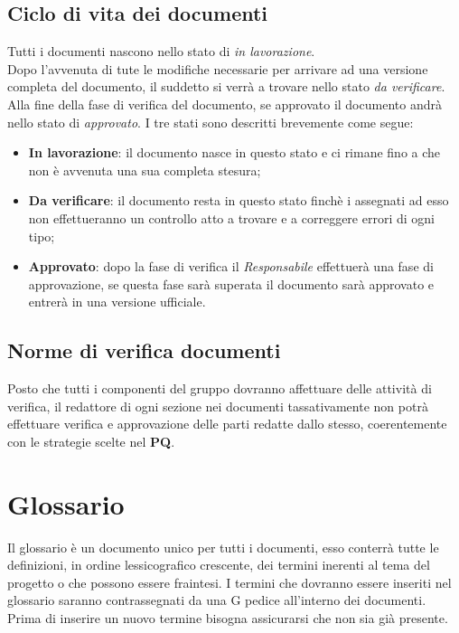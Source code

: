 \documentclass{scalatekids-article}
\begin{document}
\subsection{Ciclo di vita dei documenti}
Tutti i documenti nascono nello stato di \textit{in lavorazione}.\\
Dopo l'avvenuta di tute le modifiche necessarie per arrivare ad una versione completa del documento, il suddetto si verrà a trovare nello stato \textit{da verificare}.\\
Alla fine della fase di verifica del documento, se approvato il documento andrà nello stato di \textit{approvato}.
I tre stati sono descritti brevemente come segue:
\begin{itemize}
\item \textbf{In lavorazione}: il documento nasce in questo stato e ci rimane fino a che non è avvenuta una sua completa stesura;
\item \textbf{Da verificare}: il documento resta in questo stato finchè i  assegnati ad esso non effettueranno un controllo atto a trovare e a correggere errori di ogni tipo;
\item \textbf{Approvato}: dopo la fase di verifica il \textit{Responsabile} effettuerà una fase di approvazione, se questa fase sarà superata il documento sarà approvato e entrerà in una versione ufficiale.
\end{itemize}

\subsection{Norme di verifica documenti}
Posto che tutti i componenti del gruppo dovranno affettuare delle attività di
verifica, il redattore di ogni sezione nei documenti tassativamente non potrà
effettuare verifica e approvazione delle parti redatte dallo stesso,
coerentemente con le strategie scelte nel \textbf{PQ}.

\section{Glossario}
Il glossario è un documento unico per tutti i documenti, esso conterrà tutte le
definizioni, in ordine lessicografico crescente, dei termini inerenti al tema
del progetto o che possono essere fraintesi. I termini che dovranno essere
inseriti nel glossario saranno contrassegnati da una G pedice all'interno dei
documenti. Prima di inserire un nuovo termine bisogna assicurarsi che non sia
già presente.
\end{document}
